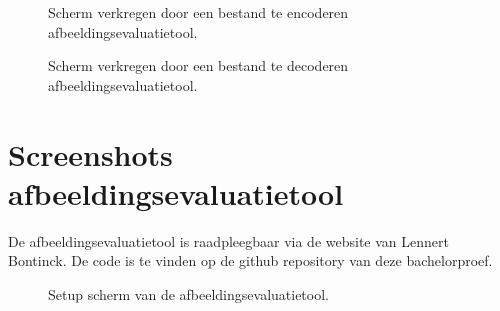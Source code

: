 \FloatBarrier
\begin{figure}[h!]
	\caption{Scherm verkregen door een bestand te encoderen \gls{afbeeldingsevaluatietool}.}
	\label{fig:bijlages-screenshot-datacompressietool-encoded}
\end{figure}
\FloatBarrier

\FloatBarrier
\begin{figure}[h!]
	\caption{Scherm verkregen door een bestand te decoderen \gls{afbeeldingsevaluatietool}.}
	\label{fig:bijlages-screenshot-datacompressietool-decoded}
\end{figure}
\FloatBarrier


\section{Screenshots afbeeldingsevaluatietool}
\label{sec:bijlages-screenshot-afbeeldingsevaluatietool}

De \gls{afbeeldingsevaluatietool} is raadpleegbaar via de website van Lennert Bontinck. De code is te vinden op de \gls{github} repository van deze bachelorproef.

\FloatBarrier
\begin{figure}[h!]
	\caption{Setup scherm van de \gls{afbeeldingsevaluatietool}.}
	\label{fig:bijlages-screenshot-afbeeldingsevaluatietool-setup}
\end{figure}
\FloatBarrier

